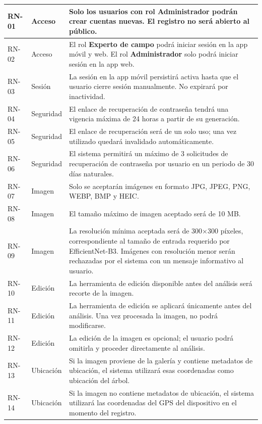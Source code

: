 \begin{longtable}{|>{\centering\arraybackslash}m{1.8cm}|>{\centering\arraybackslash}m{2.5cm}|m{9.5cm}|}
RN-01 & Acceso & Solo los usuarios con rol \textbf{Administrador} podrán crear cuentas nuevas. El registro no será abierto al público. \\
\hline
RN-02 & Acceso & El rol \textbf{Experto de campo} podrá iniciar sesión en la app móvil y web. El rol \textbf{Administrador} solo podrá iniciar sesión en la app web. \\
\hline
RN-03 & Sesión & La sesión en la app móvil persistirá activa hasta que el usuario cierre sesión manualmente. No expirará por inactividad. \\
\hline
RN-04 & Seguridad & El enlace de recuperación de contraseña tendrá una vigencia máxima de 24 horas a partir de su generación. \\
\hline
RN-05 & Seguridad & El enlace de recuperación será de un solo uso; una vez utilizado quedará invalidado automáticamente. \\
\hline
RN-06 & Seguridad & El sistema permitirá un máximo de 3 solicitudes de recuperación de contraseña por usuario en un periodo de 30 días naturales. \\
\hline
RN-07 & Imagen & Solo se aceptarán imágenes en formato JPG, JPEG, PNG, WEBP, BMP y HEIC. \\
\hline
RN-08 & Imagen & El tamaño máximo de imagen aceptado será de 10 MB. \\
\hline
RN-09 & Imagen & La resolución mínima aceptada será de 300$\times$300 píxeles, correspondiente al tamaño de entrada requerido por EfficientNet-B3. Imágenes con resolución menor serán rechazadas por el sistema con un mensaje informativo al usuario. \\
\hline
RN-10 & Edición & La herramienta de edición disponible antes del análisis será recorte de la imagen. \\
\hline
RN-11 & Edición & La herramienta de edición se aplicará únicamente antes del análisis. Una vez procesada la imagen, no podrá modificarse. \\
\hline
RN-12 & Edición & La edición de la imagen es opcional; el usuario podrá omitirla y proceder directamente al análisis. \\
\hline
RN-13 & Ubicación & Si la imagen proviene de la galería y contiene metadatos de ubicación, el sistema utilizará esas coordenadas como ubicación del árbol. \\
\hline
RN-14 & Ubicación & Si la imagen no contiene metadatos de ubicación, el sistema utilizará las coordenadas del GPS del dispositivo en el momento del registro. \\
\hline

\end{longtable}

